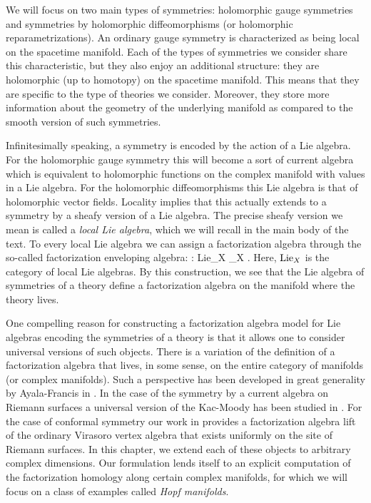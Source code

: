 We will focus on two main types of symmetries: holomorphic gauge symmetries and symmetries by holomorphic diffeomorphisms (or holomorphic reparametrizations). 
An ordinary gauge symmetry is characterized as being local on the spacetime manifold. 
Each of the types of symmetries we consider share this characteristic, but they also enjoy an additional structure: they are holomorphic (up to homotopy) on the spacetime manifold. 
This means that they are specific to the type of theories we consider.
Moreover, they store more information about the geometry of the underlying manifold as compared to the smooth version of such symmetries.

Infinitesimally speaking, a symmetry is encoded by the action of a Lie algebra.
For the holomorphic gauge symmetry this will become a sort of current algebra which is equivalent to holomorphic functions on the complex manifold with values in a Lie algebra.
For the holomorphic diffeomorphisms this Lie algebra is that of holomorphic vector fields.
Locality implies that this actually extends to a symmetry by a sheafy version of a Lie algebra. 
The precise sheafy version we mean is called a {\em local Lie algebra}, which we will recall in the main body of the text. 
To every local Lie algebra we can assign a factorization algebra through the so-called factorization enveloping algebra:
\ben
{} : {\rm Lie}_X _X .
\een
Here, ${\rm Lie}_X$ is the category of local Lie algebras.
By this construction, we see that the Lie algebra of symmetries of a theory define a factorization algebra on the manifold where the theory lives. 

One compelling reason for constructing a factorization algebra model for Lie algebras encoding the symmetries of a theory is that it allows one to consider universal versions of such objects.
There is a variation of the definition of a factorization algebra that lives, in some sense, on the entire category of manifolds (or complex manifolds). 
Such a perspective has been developed in great generality by Ayala-Francis in \cite{AFTopMan}.
In the case of the symmetry by a current algebra on Riemann surfaces a universal version of the Kac-Moody has been studied in \cite{CG1}.
For the case of conformal symmetry our work in \cite{BWVir} provides a factorization algebra lift of the ordinary Virasoro vertex algebra that exists uniformly on the site of Riemann surfaces. 
In this chapter, we extend each of these objects to arbitrary complex dimensions.
Our formulation lends itself to an explicit computation of the factorization homology along certain complex manifolds, for which we will focus on a class of examples called {\em Hopf manifolds}.


